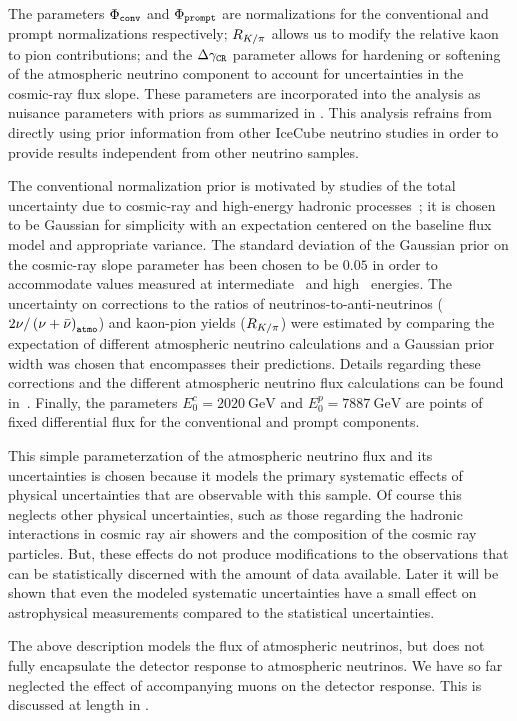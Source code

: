 The parameters $\Phi_\texttt{conv}$ and $\Phi_\texttt{prompt}$ are normalizations for the conventional and prompt normalizations respectively; $R_{K/\pi}$ allows us to modify the relative kaon to pion contributions; and the $\Delta\gamma_\texttt{CR}$ parameter allows for hardening or softening of the atmospheric neutrino component to account for uncertainties in the cosmic-ray flux slope.
These parameters are incorporated into the analysis as nuisance parameters with priors as summarized in .
This analysis refrains from directly using prior information from other IceCube neutrino studies in order to provide results independent from other neutrino samples.

The conventional normalization prior is motivated by studies of the total uncertainty due to cosmic-ray and high-energy hadronic processes~\cite{Fedynitch:2012fs}; it is chosen to be Gaussian for simplicity with an expectation centered on the baseline flux model and appropriate variance.
The standard deviation of the Gaussian prior on the cosmic-ray slope parameter has been chosen to be $0.05$ in order to accommodate values measured at intermediate~\cite{Karelin:2011zz} and high~\cite{Bartoli:2015fhw,Yoon:2017qjx,Alfaro:2017cwx} energies.
The uncertainty on corrections to the ratios of neutrinos-to-anti-neutrinos (${2\nu/\left(\nu+\bar{\nu}\right)}_\texttt{atmo}$) and kaon-pion yields ($R_{K/\pi}$) were estimated by comparing the expectation of different atmospheric neutrino calculations and a Gaussian prior width was chosen that encompasses their predictions.
Details regarding these corrections and the different atmospheric neutrino flux calculations can be found in~\cite{CollinFluxes,Jones:2015bya}.
Finally, the parameters $E_0^c=\SI{2020}\GeV$ and $E_0^p=\SI{7887}\GeV$ are points of fixed differential flux for the conventional and prompt components.

This simple parameterzation of the atmospheric neutrino flux and its uncertainties is chosen because it models the primary systematic effects of physical uncertainties that are observable with this sample.
Of course this neglects other physical uncertainties, such as those regarding the hadronic interactions in cosmic ray air showers and the composition of the cosmic ray particles.
But, these effects do not produce modifications to the observations that can be statistically discerned with the amount of data available.
Later it will be shown that even the modeled systematic uncertainties have a small effect on astrophysical measurements compared to the statistical uncertainties.

The above description models the flux of atmospheric neutrinos, but does not fully encapsulate the detector response to atmospheric neutrinos.
We have so far neglected the effect of accompanying muons on the detector response.
This is discussed at length in .

